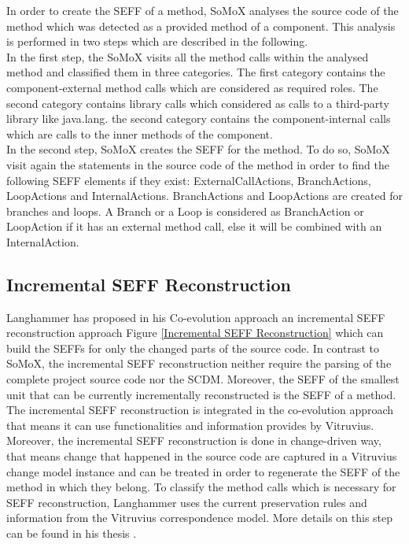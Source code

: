 In order to create the SEFF of a method, SoMoX analyses the source code of the method which was detected as a provided method of a component. This analysis is performed in two steps which are described in the following.\\

In the first step, the SoMoX visits all the method calls within the analysed method and classified them in three categories. The first category contains the component-external method calls which are considered as required roles. The second category contains library calls which considered as calls to a third-party library like java.lang. the second category contains the component-internal calls which are calls to the inner methods of the component. \\

In the second step, SoMoX creates the SEFF for the method.  To do so, SoMoX visit again the statements in the source code of the method in order to find the following SEFF elements if they exist: ExternalCallActions, BranchActions, LoopActions and InternalActions. BranchActions and LoopActions are created for branches and loops. A Branch or a Loop is considered as BranchAction or LoopAction if it has an external method call, else it will be combined with an InternalAction.\\

\subsection{Incremental SEFF Reconstruction}
\label{sec:Incremental SEFF Reconstruction}
Langhammer has proposed in his Co-evolution approach an incremental SEFF reconstruction approach Figure \ref{Incremental SEFF Reconstruction} which can build the SEFFs for only the changed parts of the source code. In contrast to SoMoX, the incremental SEFF reconstruction neither require the parsing of the complete project source code nor the SCDM. Moreover, the SEFF of the smallest unit that can be currently incrementally reconstructed is the SEFF of a method. \\

The incremental SEFF reconstruction is integrated in the co-evolution approach that means it can use functionalities and information provides by Vitruvius. Moreover, the incremental SEFF reconstruction is done in change-driven way, that means change that happened in the source code are captured in a Vitruvius change model instance and can be treated in order to regenerate the SEFF of the method in which they belong. To classify the method calls which is necessary for SEFF reconstruction, Langhammer uses the current preservation rules and information from the Vitruvius correspondence model. More details on this step can be found in his thesis \cite{langhammer2017automated}.\\

